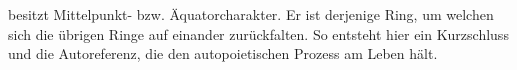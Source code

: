 \begin{newstuff}

    
    besitzt  Mittelpunkt- bzw. Äquatorcharakter.
    Er ist derjenige Ring, um welchen sich die übrigen Ringe auf einander zurückfalten. So entsteht hier ein Kurzschluss und die Autoreferenz, die den autopoietischen Prozess am Leben hält.
\end{newstuff}